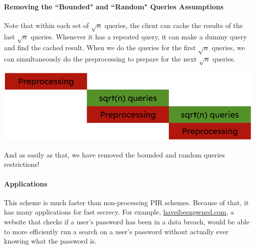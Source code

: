 \paragraph{Removing the ``Bounded" and ``Random" Queries Assumptions}
Note that within each set of $\sqrt{n}$ queries, the client can cache the results of the last $\sqrt{n}$ queries. Whenever it has a repeated query, it can make a dummy query and find the cached result. When we do the queries for the first $\sqrt{n}$ queries, we can simultaneously do the preprocessing to prepare for the next $\sqrt{n}$ queries.

\begin{center}
    \includegraphics[scale=0.77]{scrbimg.png}
\end{center}

And as easily as that, we have removed the bounded and random queries restrictions!

\paragraph{Applications}
This scheme is much faster than non-processing PIR schemes. Because of that, it has many applications for fast secrecy. For example, \href{https://haveibeenpwned.com/}{haveibeenpwned.com}, a website that checks if a user's password has been in a data breach, would be able to more efficiently run a search on a user's password without actually ever knowing what the password is.
